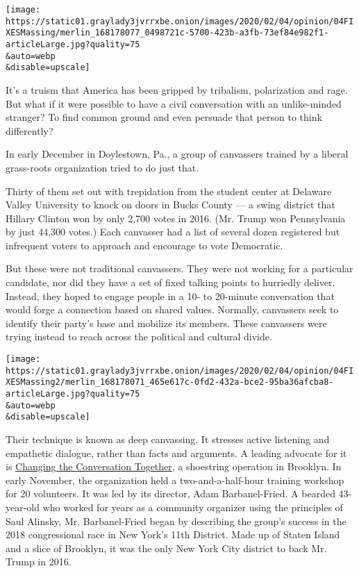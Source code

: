 \texttt{[image: https://static01.graylady3jvrrxbe.onion/images/2020/02/04/opinion/04FIXESMassing/merlin\_168178077\_0498721c-5700-423b-a3fb-73ef84e982f1-articleLarge.jpg?quality=75\\\&auto=webp\\\&disable=upscale]}

It's a truism that America has been gripped by tribalism, polarization
and rage. But what if it were possible to have a civil conversation with
an unlike-minded stranger? To find common ground and even persuade that
person to think differently?

In early December in Doylestown, Pa., a group of canvassers trained by a
liberal grass-roots organization tried to do just that.

Thirty of them set out with trepidation from the student center at
Delaware Valley University to knock on doors in Bucks County --- a swing
district that Hillary Clinton won by only 2,700 votes in 2016. (Mr.
Trump won Pennsylvania by just 44,300 votes.) Each canvasser had a list
of several dozen registered but infrequent voters to approach and
encourage to vote Democratic.

But these were not traditional canvassers. They were not working for a
particular candidate, nor did they have a set of fixed talking points to
hurriedly deliver. Instead, they hoped to engage people in a 10- to
20-minute conversation that would forge a connection based on shared
values. Normally, canvassers seek to identify their party's base and
mobilize its members. These canvassers were trying instead to reach
across the political and cultural divide.

\texttt{[image: https://static01.graylady3jvrrxbe.onion/images/2020/02/04/opinion/04FIXESMassing2/merlin\_168178071\_465e617c-0fd2-432a-bce2-95ba36afcba8-articleLarge.jpg?quality=75\\\&auto=webp\\\&disable=upscale]}

Their technique is known as deep canvassing. It stresses active
listening and empathetic dialogue, rather than facts and arguments. A
leading advocate for it is \href{https://www.ctctogether.org/}{Changing
the Conversation Together}, a shoestring operation in Brooklyn. In early
November, the organization held a two-and-a-half-hour training workshop
for 20 volunteers. It was led by its director, Adam Barbanel-Fried. A
bearded 43-year-old who worked for years as a community organizer using
the principles of Saul Alinsky, Mr. Barbanel-Fried began by describing
the group's success in the 2018 congressional race in New York's 11th
District. Made up of Staten Island and a slice of Brooklyn, it was the
only New York City district to back Mr. Trump in 2016.

